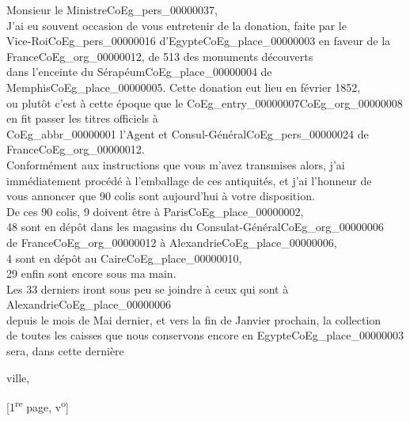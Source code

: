 \documentclass{book}
\begin{document}
\hspace{1cm} Monsieur le Ministre\gls{CoEg_pers_00000037},\\

\indent J’ai eu souvent occasion de vous entretenir de la donation, faite par le\\
Vice-Roi\gls{CoEg_pers_00000016} d’Egypte\gls{CoEg_place_00000003} en faveur de la France\gls{CoEg_org_00000012}, de 513 des monuments découverts\\
dans l’enceinte du Sérapéum\gls{CoEg_place_00000004} de Memphis\gls{CoEg_place_00000005}. Cette donation eut lieu en février 1852,\\
ou plutôt c’est à cette époque que le \Gls{CoEg_entry_00000007}\gls{CoEg_org_00000008} en fit passer les titres officiels à\\
\gls{CoEg_abbr_00000001} l’Agent et Consul-Général\gls{CoEg_pers_00000024} de France\gls{CoEg_org_00000012}.\\
\indent Conformément aux instructions que vous m’avez transmises alors, j’ai\\
immédiatement procédé à l’emballage de ces antiquités, et j’ai l’honneur de\\
vous annoncer que 90 colis sont aujourd’hui à votre disposition.\\
\indent De ces 90 colis, 9 doivent être à Paris\gls{CoEg_place_00000002},\\
\indent \hspace{2cm}48 sont en dépôt dans les magasins du Consulat-Général\gls{CoEg_org_00000006}\\
\indent \hspace{3cm} de France\gls{CoEg_org_00000012} à Alexandrie\gls{CoEg_place_00000006},\\
\indent \hspace{2cm} 4 sont en dépôt au Caire\gls{CoEg_place_00000010},\\
\indent \hspace{2cm} 29 enfin sont encore sous ma main.\\
\indent Les 33 derniers iront sous peu se joindre à ceux qui sont à Alexandrie\gls{CoEg_place_00000006}\\
depuis le mois de Mai dernier, et vers la fin de Janvier prochain, la collection\\
de toutes les caisses que nous conservons encore en Egypte\gls{CoEg_place_00000003} sera, dans cette dernière
\begin{flushright}ville,\end{flushright}
{\footnotesize\begin{center} {[1\textsuperscript{re} page, v\textsuperscript{o}]}\end{center}}
\end{document}
